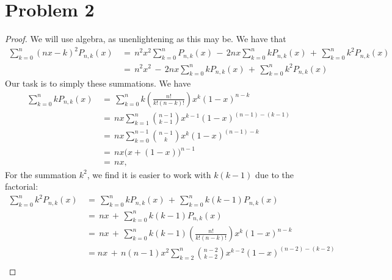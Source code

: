\documentclass[11pt]{article}
\begin{document}

\section{Problem 2}

\begin{proof}
  We will use algebra, as unenlightening as this may be. We have that
  \begin{align*}
    \sum\limits_{k = 0}^{n} (nx - k)^{2} P_{n, k}(x) \, &= \, n^{2} x^{2} \sum\limits_{k = 0}^{n} P_{n, k}(x) \, - \, 2nx \sum\limits_{k = 0}^{n} k P_{n, k}(x) \, + \, \sum\limits_{k = 0}^{n} k^{2} P_{n, k}(x) \\
                                                        &= \, n^{2} x^{2} \, - \, 2nx \sum\limits_{k = 0}^{n} k P_{n, k}(x) \, + \, \sum\limits_{k = 0}^{n} k^{2} P_{n, k}(x)
  \end{align*}
  Our task is to simply these summations. We have
  \begin{align*}
    \sum\limits_{k = 0}^{n} k P_{n, k}(x) \, &= \, \sum\limits_{k = 0}^{n} k \left( \frac{n!}{k! (n - k)!} \right) x^{k} (1 - x)^{n - k} \\
                                             &= \, nx \sum\limits_{k = 1}^{n} \binom{n - 1}{k - 1} x^{k - 1} (1 - x)^{(n - 1) - (k - 1)} \\
                                             &= \, nx \sum\limits_{k = 0}^{n - 1} \binom{n - 1}{k} x^{k} (1 - x)^{(n - 1) - k} \\
                                             &= \, nx \big( x + (1 - x) \big)^{n - 1} \\
                                             &= \, nx,
  \end{align*}
  For the summation $k^{2}$, we find it is easier to work with $k(k - 1)$ due to the factorial:
  \begin{align*}
    \sum\limits_{k = 0}^{n} k^{2} P_{n, k}(x) \, &= \, \sum\limits_{k = 0}^{n} k P_{n, k}(x) \, + \, \sum\limits_{k = 0}^{n} k(k - 1) P_{n, k}(x) \\
                                                 &= \, nx \, + \, \sum\limits_{k = 0}^{n} k(k - 1) P_{n, k}(x) \\
                                                 &= \, nx \, + \, \sum\limits_{k = 0}^{n} k(k - 1) \left( \frac{n!}{k!(n - k)!} \right) x^{k}(1 - x)^{n - k} \\
                                                 &= nx \, + \, n(n - 1)x^{2} \sum\limits_{k = 2}^{n} \binom{n - 2}{k - 2} x^{k - 2}(1 - x)^{(n - 2) - (k - 2)} \\

\end{align*}
\end{proof}
\end{document}
